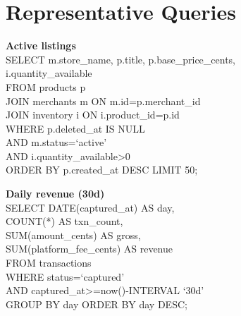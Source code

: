 \documentclass[8pt,a4paper]{extarticle}
\begin{document}
\section{Representative Queries}

\begin{minipage}{0.48\textwidth}
  \begin{tcolorbox}[colback=bglight,colframe=accent!40,sharp corners,boxrule=0.3pt,
    left=2mm,right=2mm,top=1.5mm,bottom=1.5mm,before skip=1pt,after skip=0pt]
    {\fontsize{6.5}{8}\selectfont\color{primary}\textbf{Active listings}}\\[0.5pt]
    {\fontsize{5.5}{7}\selectfont\ttfamily
      SELECT m.store\_name, p.title, p.base\_price\_cents,\\
      \quad i.quantity\_available\\
      \quad FROM products p\\
      \quad JOIN merchants m ON m.id=p.merchant\_id\\
      \quad JOIN inventory i ON i.product\_id=p.id\\
      \quad WHERE p.deleted\_at IS NULL\\
      \qquad AND m.status=`active'\\
      \qquad AND i.quantity\_available>0\\
      \quad ORDER BY p.created\_at DESC LIMIT 50;
    }
  \end{tcolorbox}
\end{minipage}
\par
\begin{minipage}{0.48\textwidth}
  \begin{tcolorbox}[colback=bglight,colframe=accent!40,sharp corners,boxrule=0.3pt,
    left=2mm,right=2mm,top=1.5mm,bottom=1.5mm,before skip=1pt,after skip=0pt]
    {\fontsize{6.5}{8}\selectfont\color{primary}\textbf{Daily revenue (30d)}}\\[0.5pt]
    {\fontsize{5.5}{7}\selectfont\ttfamily
      SELECT DATE(captured\_at) AS day,\\
      \quad COUNT(*) AS txn\_count,\\
      \quad SUM(amount\_cents) AS gross,\\
      \quad SUM(platform\_fee\_cents) AS revenue\\
      \quad FROM transactions\\
      \quad WHERE status=`captured'\\
      \qquad AND captured\_at>=now()-INTERVAL `30d'\\
      \quad GROUP BY day ORDER BY day DESC;
    }
  \end{tcolorbox}
\end{minipage}
\par
\end{document}
